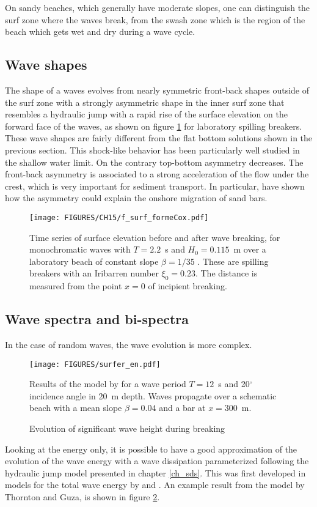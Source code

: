 On sandy beaches, which generally have moderate slopes, one can distinguish the surf zone where the waves break, from the swash zone which is
the region of the beach which gets wet and dry during a wave cycle. 


\subsection{Wave shapes}
The shape of a waves evolves from nearly symmetric front-back shapes outside of the surf zone
with a strongly asymmetric shape in the inner surf zone that resembles a hydraulic jump with a rapid rise of the surface elevation on 
the forward face of the waves, as shown on figure \ref{f_surf_formeCox} for laboratory spilling breakers. These wave  shapes are fairly different from the flat bottom 
solutions shown in the previous section. This shock-like behavior has 
been particularly well studied in the shallow water limit\citep{Bonneton&al2004}.
On the contrary top-bottom asymmetry decreases. The front-back asymmetry is associated to a strong acceleration of the flow 
under the crest, which is very important for sediment transport. In particular, \cite{Hoefel&Elgar2003} have shown how the asymmetry  
could explain the onshore migration of sand bars. 

\begin{figure}
\centerline{\texttt{[image: FIGURES/CH15/f\_surf\_formeCox.pdf]}}
 \caption{Time series of surface elevation before and after wave breaking, for monochromatic waves with $T=2.2$~s and $H_0 =0.115$~m over a laboratory beach of 
 constant slope $\beta=1/35$ \citep[taken from][]{Cox1995}. These are spilling breakers with an Iribarren number $\xi_0 = 0.23$.  
 The distance is measured from the point $x=0$ of incipient breaking. \label{f_surf_formeCox}}
\end{figure}


\subsection{Wave spectra and bi-spectra}
In the case of random waves, the wave evolution is more complex. 
\begin{figure}[htb]
\centerline{\texttt{[image: FIGURES/surfer\_en.pdf]}}
  \caption{Evolution of significant wave height during breaking}
    {Results of the model by \cite{Thornton&Guza1986}  for a wave period $T=12$~s and 20$^\circ$ incidence angle 
    in 20~m depth. Waves propagate over a schematic beach with a mean slope $\beta=0.04$ 
    and a bar at $x=300$~m.}
\label{fig:surfer}
\end{figure}
Looking at the energy only, it is possible to have a good approximation of the 
evolution of the wave energy with a wave dissipation parameterized following the hydraulic jump model presented in chapter \ref{ch_sds}. This was first 
developed in models for the total wave energy by \cite{Battjes&Janssen1978} and \cite{Thornton&Guza1983}. 
An example result from the model by Thornton and Guza, is shown in figure \ref{fig:surfer}. 

